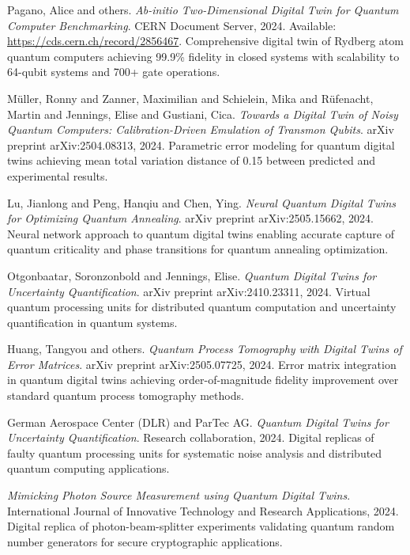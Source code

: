 \documentclass[12pt,a4paper]{article}
\begin{document}
\begin{thebibliography}{99}

Pagano, Alice and others.
\textit{Ab-initio Two-Dimensional Digital Twin for Quantum Computer Benchmarking}.
CERN Document Server, 2024.
Available: \url{https://cds.cern.ch/record/2856467}.
Comprehensive digital twin of Rydberg atom quantum computers achieving 99.9\% fidelity in closed systems with scalability to 64-qubit systems and 700+ gate operations.

Müller, Ronny and Zanner, Maximilian and Schielein, Mika and Rüfenacht, Martin and Jennings, Elise and Gustiani, Cica.
\textit{Towards a Digital Twin of Noisy Quantum Computers: Calibration-Driven Emulation of Transmon Qubits}.
arXiv preprint arXiv:2504.08313, 2024.
Parametric error modeling for quantum digital twins achieving mean total variation distance of 0.15 between predicted and experimental results.

Lu, Jianlong and Peng, Hanqiu and Chen, Ying.
\textit{Neural Quantum Digital Twins for Optimizing Quantum Annealing}.
arXiv preprint arXiv:2505.15662, 2024.
Neural network approach to quantum digital twins enabling accurate capture of quantum criticality and phase transitions for quantum annealing optimization.

Otgonbaatar, Soronzonbold and Jennings, Elise.
\textit{Quantum Digital Twins for Uncertainty Quantification}.
arXiv preprint arXiv:2410.23311, 2024.
Virtual quantum processing units for distributed quantum computation and uncertainty quantification in quantum systems.

Huang, Tangyou and others.
\textit{Quantum Process Tomography with Digital Twins of Error Matrices}.
arXiv preprint arXiv:2505.07725, 2024.
Error matrix integration in quantum digital twins achieving order-of-magnitude fidelity improvement over standard quantum process tomography methods.

German Aerospace Center (DLR) and ParTec AG.
\textit{Quantum Digital Twins for Uncertainty Quantification}.
Research collaboration, 2024.
Digital replicas of faulty quantum processing units for systematic noise analysis and distributed quantum computing applications.

\textit{Mimicking Photon Source Measurement using Quantum Digital Twins}.
International Journal of Innovative Technology and Research Applications, 2024.
Digital replica of photon-beam-splitter experiments validating quantum random number generators for secure cryptographic applications.


\end{thebibliography}
\end{document}
